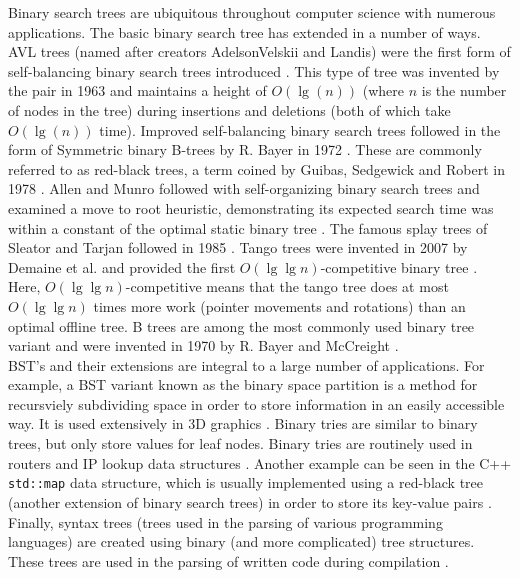 \documentclass[letterpaper,12pt,titlepage,oneside,final]{book}
\theoremstyle{plain}
\begin{document}
Binary search trees are ubiquitous throughout computer science with numerous applications. The basic binary search tree has extended in a number of ways. AVL trees (named after creators AdelsonVelskii and Landis) were the first form of self-balancing binary search trees introduced \cite{adelsonvelskii1963algorithm}. This type of tree was invented by the pair in 1963 and maintains a height of $O(\lg(n))$ (where $n$ is the number of nodes in the tree) during insertions and deletions (both of which take $O(\lg(n))$ time). Improved self-balancing binary search trees followed in the form of Symmetric binary B-trees by R. Bayer in 1972 \cite{bayer1972symmetric}. These are commonly referred to as red-black trees, a term coined by Guibas, Sedgewick and Robert in 1978 \cite{guibas1978dichromatic}. Allen and Munro followed with self-organizing binary search trees and examined a move to root heuristic, demonstrating its expected search time was within a constant of the optimal static binary tree \cite{allen1978self}. The famous splay trees of Sleator and Tarjan followed in 1985 \cite{sleator1985self}. Tango trees were invented in 2007 by Demaine et al. and provided the first $O(\lg \lg n)$-competitive binary tree \cite{demaine2007dynamic}. Here, $O(\lg \lg n)$-competitive means that the tango tree does at most $O(\lg \lg n)$ times more work (pointer movements and rotations) than an optimal offline tree. B trees are among the most commonly used binary tree variant and were invented in 1970 by R. Bayer and McCreight \cite{bayer1970organization}. \\

BST's and their extensions are integral to a large number of applications. For example, a BST variant known as the binary space partition is a method for recursviely subdividing space in order to store information in an easily accessible way. It is used extensively in 3D graphics \cite{schumacker1969study, paterson1992optimal}. Binary tries are similar to binary trees, but only store values for leaf nodes. Binary tries are routinely used in routers and IP lookup data structures \cite{song2010building}. Another example can be seen in the C++ \texttt{std::map} data structure, which is usually implemented using a red-black tree (another extension of binary search trees) in order to store its key-value pairs \cite{CppMap}. Finally, syntax trees (trees used in the parsing of various programming languages) are created using binary (and more complicated) tree structures. These trees are used in the parsing of written code during compilation \cite{louden1997compiler}.
\end{document}
